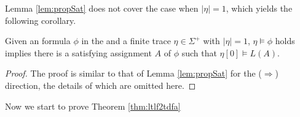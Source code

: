 Lemma \ref{lem:propSat} does not cover the case when $|\eta|=1$, which yields the following corollary. 

\begin{corollary}\label{coro:propSat}
Given an \ltlf formula $\phi$ in the \XNF and a finite trace $\eta\in\Sigma^+$ with $|\eta|=1$, $\eta\models\phi$ holds implies there is a satisfying assignment $A$ of $\phi$ such that $\eta[0]\models L(A)$.
\end{corollary}
\begin{proof}
The proof is similar to that of Lemma \ref{lem:propSat} for the ($\Rightarrow$) direction, the details of which are omitted here.
\end{proof}

Now we start to prove Theorem \ref{thm:ltlf2tdfa}
\iffalse
\begin{theorem}
Given an \ltlf formula $\phi$ and the \TDFA ${\A_{\phi}}$ constructed by Definition \ref{def:ltlf2dfa}, a finite trace $\eta\models\phi$ holds iff $\eta$ is accepted by ${\A_{\phi}}$. 
\end{theorem}
\fi

